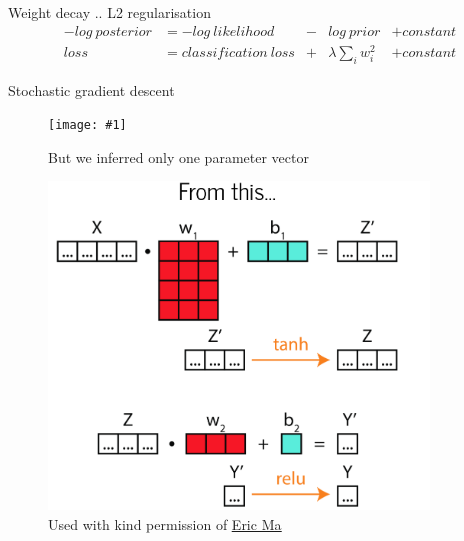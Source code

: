 \documentclass{beamer}
\newcommand{\fitfigure}[1]{\centering\texttt{[image: \#1]}}
\newcommand{\mdlink}[2]{\href{#2}{\underline{#1}}}
\begin{document}
\begin{frame}{Weight decay .. L2 regularisation}
	\begin{align*}
		-log \ posterior & =  -log \ likelihood    & - & log \ prior          & + constant \\
		loss             & = classification \ loss & + & \lambda \sum_i w_i^2 & + constant 
	\end{align*}
\end{frame}

\begin{frame}{Stochastic gradient descent}
	\begin{figure}
		\fitfigure{im/sgd.png}
		\caption{But we inferred only one parameter vector}
	\end{figure}
\end{frame}

\begin{frame}
	\begin{figure}
		\centering
		\includegraphics[width = 0.9\textwidth]{im/going_bayesian1.png}
		\caption{Used with kind permission of \mdlink{Eric Ma}{https://ericmjl.github.io/}}
	\end{figure}
\end{frame}
\end{document}
